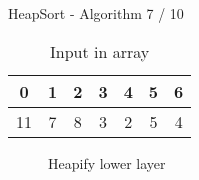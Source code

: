 \documentclass[notes=hide,pdftex,14pt]{beamer}
\begin{document}
\begin{frame}{HeapSort - Algorithm 7 / 10}
  \vspace{-1.0em}
  \begin{table}[!h]%
    \caption{Input in array}%
    \label{tab:heapify_numbers}%
    \begin{tabular}{ccccccc}
      {\color{Greenb}0}&
      {\color{Greenb}1}&
      {\color{Greenb}2}&
      {\color{Greenb}3}&
      {\color{Greenb}4}&
      {\color{Greenb}5}&
      {\color{Greenb}6}\\
      \hline
      \multicolumn{1}{|c}{11}&%
      \multicolumn{1}{|c}{7}&%
      \multicolumn{1}{|c}{8}&%
      \multicolumn{1}{|c}{3}&%
      \multicolumn{1}{|c}{2}&%
      \multicolumn{1}{|c}{5}&%
      \multicolumn{1}{|c|}{4}\\
      \hline
    \end{tabular}
  \end{table}
  \vspace*{-0.5em}
  \begin{centering}
    \begin{figure}[!h]%
      \begin{columns}%
        \begin{column}{0.425\textwidth}%
          \begin{adjustbox}{width=\linewidth}%
          \end{adjustbox}%
        \end{column}%
        \begin{column}{0.425\textwidth}%
          \begin{adjustbox}{width=\linewidth}%
          \end{adjustbox}%
        \end{column}%
      \end{columns}%
      \caption{Heapify lower layer}%
      \label{fig:heapify_lower}%
    \end{figure}
  \end{centering}
\end{frame}

\end{document}

